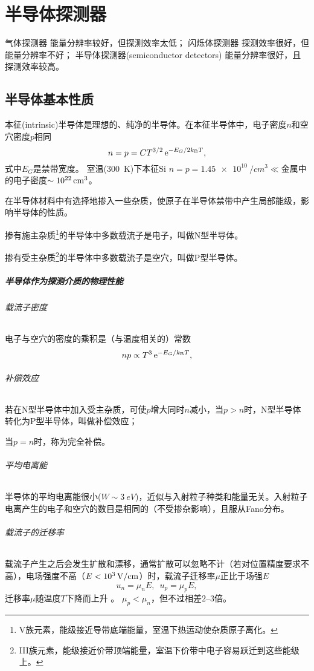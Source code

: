 \chapter{半导体探测器}
气体探测器
能量分辨率较好，但探测效率太低；
闪烁体探测器
探测效率很好，但能量分辨率不好；%
半导体探测器(semiconductor detectors)
能量分辨率很好，且探测效率较高。

\section{半导体基本性质}

本征(intrinsic)半导体是理想的、纯净的半导体。在本征半导体中，电子密度$n$和空穴密度$p$相同
\[
	n=p=CT^{3/2}\mathop{}\!\mathrm{e}^{-E_G/2k_{\mathrm B} T},
\]
式中$E_G$是禁带宽度。
室温(\SI{300}{K})下本征Si $n=p=\SI{1.45e10}{/cm^3}\ll$金属中的电子密度$\sim\SI{E22}{/cm^3}$。

在半导体材料中有选择地掺入一些杂质，使原子在半导体禁带中产生局部能级，影响半导体的性质。
\begin{compactitem}
	\item 掺有施主杂质\footnote{V族元素，能级接近导带底端能量，室温下热运动使杂质原子离化。}的半导体中多数载流子是电子，叫做N型半导体。
	\item 掺有受主杂质\footnote{III族元素，能级接近价带顶端能量，室温下价带中电子容易跃迁到这些能级上。}的半导体中多数载流子是空穴，叫做P型半导体。
\end{compactitem}
\paragraph{半导体作为探测介质的物理性能}
\subparagraph{载流子密度}
电子与空穴的密度的乘积是（与温度相关的）常数
\[
	np\propto T^3\mathop{}\!\mathrm{e}^{-E_G/k_{\mathrm B} T},
\]
\subparagraph{补偿效应}
若在N型半导体中加入受主杂质，可使$p$增大同时$n$减小，当$p>n$时，N型半导体转化为P型半导体，叫做补偿效应；

当$p=n$时，称为完全补偿。

\subparagraph{平均电离能}
半导体的平均电离能很小($W\sim\SI{3}{eV}$)，近似与入射粒子种类和能量无关。入射粒子电离产生的电子和空穴的数目是相同的（不受掺杂影响），且服从Fano分布。
\subparagraph{载流子的迁移率}
载流子产生之后会发生扩散和漂移，通常扩散可以忽略不计（若对位置精度要求不高），电场强度不高（$E<\SI{E3}{V/cm}$）时，载流子迁移率$\mu$正比于场强$E$
\[
	u_n=\mu_nE,\enspace u_p=\mu_pE,
\]
迁移率$\mu$随温度$T$下降而上升%
。%
$\mu_p<\mu_n$，但不过相差$\numrange{2}{3}$倍。

